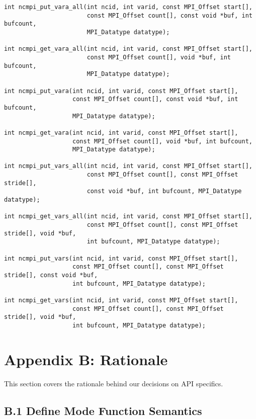 \documentclass[10pt]{article}
\begin{document}
\begin{verbatim}
int ncmpi_put_vara_all(int ncid, int varid, const MPI_Offset start[],
                       const MPI_Offset count[], const void *buf, int bufcount,
                       MPI_Datatype datatype);

int ncmpi_get_vara_all(int ncid, int varid, const MPI_Offset start[],
                       const MPI_Offset count[], void *buf, int bufcount,
                       MPI_Datatype datatype);

int ncmpi_put_vara(int ncid, int varid, const MPI_Offset start[],
                   const MPI_Offset count[], const void *buf, int bufcount,
                   MPI_Datatype datatype);

int ncmpi_get_vara(int ncid, int varid, const MPI_Offset start[],
                   const MPI_Offset count[], void *buf, int bufcount,
                   MPI_Datatype datatype);

int ncmpi_put_vars_all(int ncid, int varid, const MPI_Offset start[],
                       const MPI_Offset count[], const MPI_Offset stride[],
                       const void *buf, int bufcount, MPI_Datatype datatype);

int ncmpi_get_vars_all(int ncid, int varid, const MPI_Offset start[],
                       const MPI_Offset count[], const MPI_Offset stride[], void *buf,
                       int bufcount, MPI_Datatype datatype);

int ncmpi_put_vars(int ncid, int varid, const MPI_Offset start[],
                   const MPI_Offset count[], const MPI_Offset stride[], const void *buf,
                   int bufcount, MPI_Datatype datatype);

int ncmpi_get_vars(int ncid, int varid, const MPI_Offset start[],
                   const MPI_Offset count[], const MPI_Offset stride[], void *buf,
                   int bufcount, MPI_Datatype datatype);
\end{verbatim}
%
%
\section*{Appendix B: Rationale}

This section covers the rationale behind our decisions on API specifics.

%
%
\subsection*{B.1  Define Mode Function Semantics}
\end{document}
